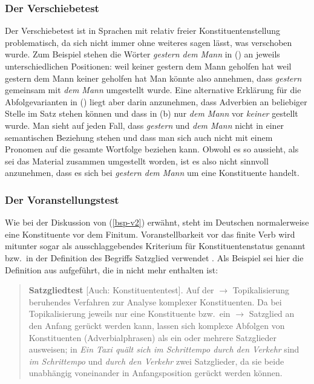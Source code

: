 \documentclass[ number=45
			   ,series=eotms
			   ,printondemand
			  ]{langsci}
\newcommand{\page}{S.\,}
\let\citew=\citealp
\begin{document}
{\subsubsection{Der Verschiebetest}

Der Verschiebetest ist in Sprachen mit relativ freier Konstituentenstellung problematisch, da sich
nicht immer ohne weiteres sagen lässt, was verschoben wurde. Zum Beispiel stehen die Wörter
\emph{gestern dem Mann} in () an jeweils unterschiedlichen Positionen:
\eal
\ex weil keiner gestern dem Mann geholfen hat
\ex weil gestern dem Mann keiner geholfen hat
\zl
Man könnte also annehmen, dass \emph{gestern} gemeinsam mit \emph{dem Mann} umgestellt wurde. Eine
alternative Erklärung für die Abfolgevarianten in () liegt aber darin anzunehmen, dass
Adverbien an beliebiger Stelle im Satz stehen können und dass in (b) nur \emph{dem Mann} vor
\emph{keiner} gestellt wurde. Man sieht auf jeden Fall, dass \emph{gestern} und \emph{dem Mann} nicht
in einer semantischen Beziehung stehen und dass man sich auch nicht mit einem Pronomen auf die
gesamte Wortfolge beziehen kann. Obwohl es so aussieht, als sei das Material zusammen umgestellt
worden, ist es also nicht sinnvoll anzunehmen, dass es sich bei \emph{gestern dem Mann} um eine
Konstituente handelt.





\subsubsection{Der Voranstellungstest}
\label{sec-konst-test-probleme-voranstellung} 

Wie
 bei der Diskussion von (\ref{bsp-v2}) erwähnt, steht im Deutschen normalerweise
eine Konstituente vor dem Finitum. Voranstellbarkeit vor das finite Verb wird mitunter
sogar als ausschlaggebendes Kriterium für Konstituentenstatus genannt bzw.\ in der Definition des
Begriffs Satzglied verwendet \citep[\page 783]{Duden2005}. Als Beispiel sei
hier die Definition aus \citew{Bussmann83a} aufgeführt, die in \citew{Bussmann90a}
nicht mehr enthalten ist:
\begin{quote}
{\bf Satzgliedtest} [Auch: Konstituententest]. Auf der $\to$ Topikalisierung
beruhendes Verfahren zur Analyse komplexer Konstituenten. Da bei Topikalisierung
jeweils nur eine Konstituente bzw.\ ein $\to$ Satzglied an den Anfang gerückt werden kann,
lassen sich komplexe Abfolgen von Konstituenten (\zb Adverbialphrasen) als
ein oder mehrere Satzglieder ausweisen; in \textit{Ein Taxi quält sich im Schrittempo
durch den Verkehr} sind \textit{im Schrittempo} und \textit{durch den Verkehr}
zwei Satzglieder, da sie beide unabhängig voneinander in Anfangsposition gerückt werden
können. \citep[\page446]{Bussmann83a}
\end{quote}

}
\end{document}
